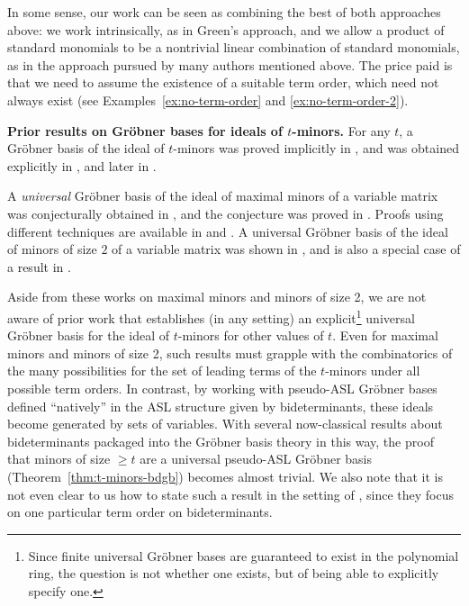 \documentclass[11pt,reqno]{amsart}
\newcommand{\gb}{Gr\"{o}bner }
\theoremstyle{definition}
\numberwithin{equation}{section}
\begin{document}
In some sense, our work can be seen as combining the best of both approaches above: we work intrinsically, as in Green's approach, and we allow a product of standard monomials to be a nontrivial linear combination of standard monomials, as in the approach pursued by many authors mentioned above. The price paid is that we need to assume the existence of a suitable term order, which need not always exist (see Examples~\ref{ex:no-term-order} and \ref{ex:no-term-order-2}).

\textbf{Prior results on Gröbner bases for ideals of $t$-minors.} 
For any $t$, a \gb basis of the ideal of $t$-minors was proved implicitly in \cite{narasimhan, abhyankar}, and was obtained explicitly in \cite{caniglia, sturmfels-stanley-gb}, and later in \cite{ma-minors-1994}.

A \emph{universal} \gb basis of the ideal of maximal minors of a variable matrix was conjecturally obtained in \cite{sturmfels-maximal-1993}, and the conjecture was proved in \cite{bernstein1993combinatorics}. Proofs using different techniques are available in \cite{kalinin} and \cite{cdg-universal-2015}. A universal \gb basis of the ideal of minors of size $2$ of a variable matrix was shown in \cite{sturmfels1996grobner}, and is also a special case of a result in \cite[Proposition 10.1.11]{villarreal-monomial-2015}.

Aside from these works on maximal minors and minors of size 2, we are not aware of prior work that establishes (in any setting) an explicit\footnote{Since finite universal Gröbner bases are guaranteed to exist in the polynomial ring, the question is not whether one exists, but of being able to explicitly specify one.} universal Gröbner basis for the ideal of $t$-minors for other values of $t$. Even for maximal minors and minors of size 2, such results must grapple with the combinatorics of the many possibilities for the set of leading terms of the $t$-minors under all possible term orders. In contrast, by working with pseudo-ASL Gröbner bases defined ``natively'' in the ASL structure given by bideterminants, these ideals become generated by sets of variables. With several now-classical results about bideterminants packaged into the Gröbner basis theory in this way, the proof that minors of size $\geq t$ are a universal pseudo-ASL Gröbner basis (Theorem~\ref{thm:t-minors-bdgb}) becomes almost trivial. We also note that it is not even clear to us how to state such a result in the setting of \cite{li-reduction-2014}, since they focus on one particular term order on bideterminants.
\end{document}
